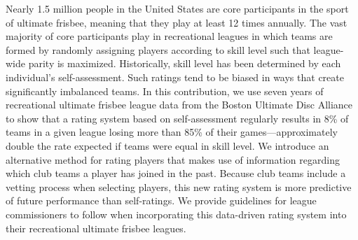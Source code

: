 Nearly 1.5 million people in the United States are core participants in the sport of ultimate frisbee, meaning that they play at least 12 times annually. The vast majority of core participants play in recreational leagues in which teams are formed by randomly assigning players according to skill level such that league-wide parity is maximized. Historically, skill level has been determined by each individual’s self-assessment. Such ratings tend to be biased in ways that create significantly imbalanced teams. In this contribution, we use seven years of recreational ultimate frisbee league data from the Boston Ultimate Disc Alliance to show that a rating system based on self-assessment regularly results in 8\% of teams in a given league losing more than 85\% of their games---approximately double the rate expected if teams were equal in skill level.  We introduce an alternative method for rating players that makes use of information regarding which club teams a player has joined in the past. Because club teams include a vetting process when selecting players, this new rating system is more predictive of future performance than self-ratings. We provide guidelines for league commissioners to follow when incorporating this data-driven rating system into their recreational ultimate frisbee leagues.